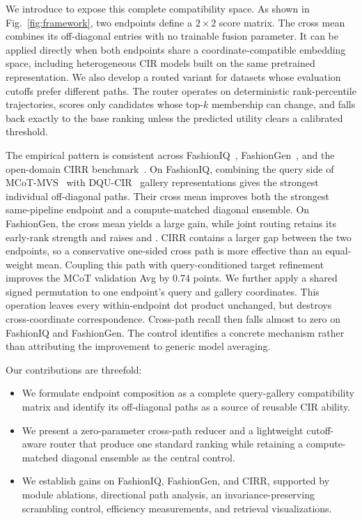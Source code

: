 We introduce \method to expose this complete compatibility space. As shown in Fig.~\ref{fig:framework}, two endpoints define a $2\times2$ score matrix. The cross mean combines its off-diagonal entries with no trainable fusion parameter. It can be applied directly when both endpoints share a coordinate-compatible embedding space, including heterogeneous CIR models built on the same pretrained representation. We also develop a routed variant for datasets whose evaluation cutoffs prefer different paths. The router operates on deterministic rank-percentile trajectories, scores only candidates whose top-$k$ membership can change, and falls back exactly to the base ranking unless the predicted utility clears a calibrated threshold.

The empirical pattern is consistent across FashionIQ~\cite{wufashioniq}, FashionGen~\cite{yuan2026fashionmv}, and the open-domain CIRR benchmark~\cite{liucirr}. On FashionIQ, combining the query side of MCoT-MVS~\cite{ge2026mcot} with DQU-CIR~\cite{wen2024dqu} gallery representations gives the strongest individual off-diagonal paths. Their cross mean improves both the strongest same-pipeline endpoint and a compute-matched diagonal ensemble. On FashionGen, the cross mean yields a large \Rone gain, while joint routing retains its early-rank strength and raises \Rfive and \Rten. CIRR contains a larger gap between the two endpoints, so a conservative one-sided cross path is more effective than an equal-weight mean. Coupling this path with query-conditioned target refinement improves the MCoT validation Avg by 0.74 points. We further apply a shared signed permutation to one endpoint's query and gallery coordinates. This operation leaves every within-endpoint dot product unchanged, but destroys cross-coordinate correspondence. Cross-path recall then falls almost to zero on FashionIQ and FashionGen. The control identifies a concrete mechanism rather than attributing the improvement to generic model averaging.

Our contributions are threefold:
\begin{itemize}
    \item We formulate endpoint composition as a complete query-gallery compatibility matrix and identify its off-diagonal paths as a source of reusable CIR ability.
    \item We present a zero-parameter cross-path reducer and a lightweight cutoff-aware router that produce one standard ranking while retaining a compute-matched diagonal ensemble as the central control.
    \item We establish gains on FashionIQ, FashionGen, and CIRR, supported by module ablations, directional path analysis, an invariance-preserving scrambling control, efficiency measurements, and retrieval visualizations.
\end{itemize}
